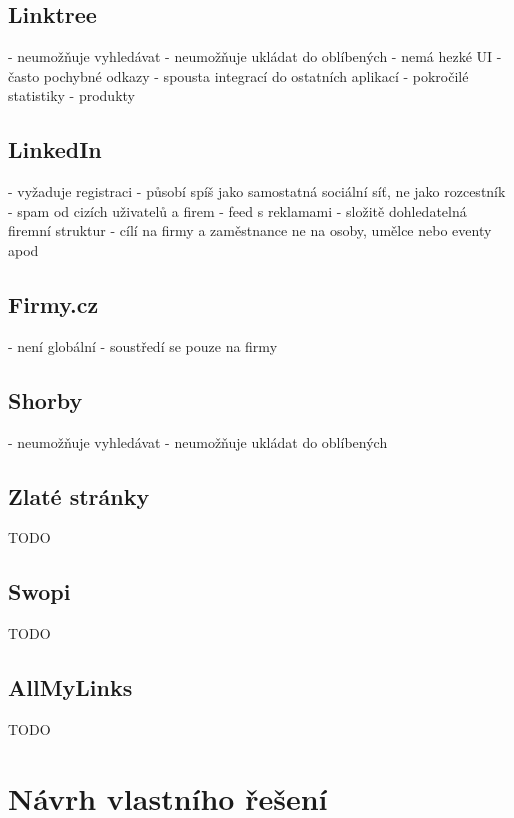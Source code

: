 	\subsection{Linktree}
	- neumožňuje vyhledávat
	- neumožňuje ukládat do oblíbených
	- nemá hezké UI
	- často pochybné odkazy
	- spousta integrací do ostatních aplikací
	- pokročilé statistiky
	- produkty

	\subsection{LinkedIn}

	- vyžaduje registraci
	- působí spíš jako samostatná sociální síť, ne jako rozcestník
	- spam od cizích uživatelů a firem
	- feed s reklamami
	- složitě dohledatelná firemní struktur
	- cílí na firmy a zaměstnance ne na osoby, umělce nebo eventy apod

	\subsection{Firmy.cz}

	- není globální
	- soustředí se pouze na firmy

	\subsection{Shorby}

	- neumožňuje vyhledávat
	- neumožňuje ukládat do oblíbených

	\subsection{Zlaté stránky}

	TODO

	\subsection{Swopi}

	TODO

	\subsection{AllMyLinks}

	TODO


\section{Návrh vlastního řešení}

